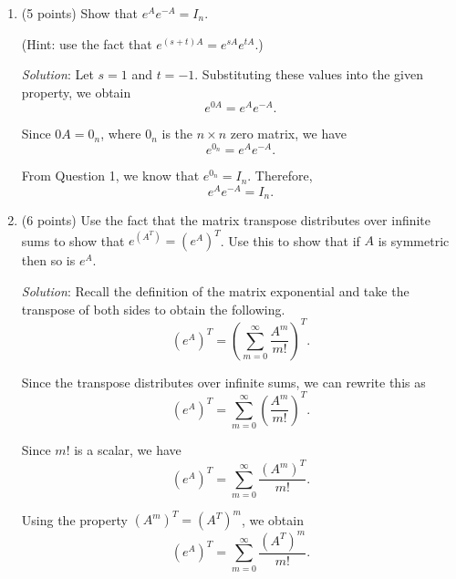 \documentclass{article}
\begin{document}
\begin{enumerate}
        In other words, raising $e$ to the power of a diagonal matrix $B$ is equal to the diagonal matrix with $e$ raised to the corresponding component of $B$ on the diagonal. Therefore, substituting the given matrix $A$ for $B$ on the left-hand side and the corresponding diagonal entries from $A$ as powers of $e$ on the right-hand side, we obtain
        \[
          \boxed{
            e^A =
            \begin{bmatrix}
              e^2 & 0   \\
              0   & e^3
            \end{bmatrix}
          }.
        \]

  \item (5 points) Show that $e^A e^{-A} = I_n$.

        (Hint: use the fact that $e^{(s+t)A} = e^{sA}e^{tA}$.)

        \emph{Solution}: Let $s=1$ and $t=-1$. Substituting these values
        into the given property, we obtain
        \[
          e^{0A} = e^Ae^{-A}.
        \]

        Since $0A=0_n$, where $0_n$ is the $n \times n$
        zero matrix, we have
        \[
          e^{0_n} = e^Ae^{-A}.
        \]

        From Question 1, we know that $e^{0_n}=I_n$.
        Therefore,
        \[
          \boxed{e^Ae^{-A}=I_n}.
        \]

  \item (6 points) Use the fact that the matrix transpose distributes over infinite sums to show that $e^{(A^T)} = (e^A)^T$. Use this to show that if $A$ is symmetric then so is $e^A$.

        \emph{Solution}: Recall the definition of the matrix
        exponential and take the transpose of both sides to obtain the following.
        \[
          (e^A)^T =
          \left(\sum_{m=0}^{\infty}\frac{A^m}{m!}\right)^T.
        \]

        Since the transpose distributes over infinite sums,
        we can rewrite this as
        \[
          (e^A)^T =
          \sum_{m=0}^{\infty}
          \left(\frac{A^m}{m!}\right)^T.
        \]

        Since $m!$ is a scalar, we have
        \[
          (e^A)^T =
          \sum_{m=0}^{\infty}\frac{(A^m)^T}{m!}.
        \]

        Using the property $(A^m)^T=(A^T)^m$,
        we obtain
        \[
          (e^A)^T =
          \sum_{m=0}^{\infty}\frac{(A^T)^m}{m!}.
        \]


\end{enumerate}
\end{document}
